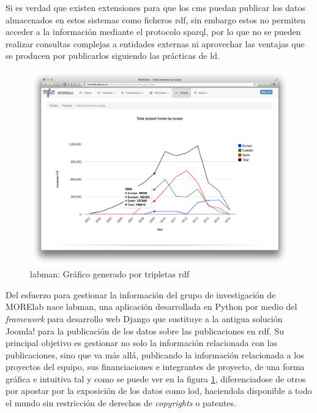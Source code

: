 Si es verdad que existen extensiones para que los \acrshort{cms} puedan publicar los datos almacenados en estos sistemas como ficheros \acrfull{rdf}, sin embargo estos no permiten acceder a la información mediante el protocolo \acrshort{sparql}, por lo que no se pueden realizar consultas complejas a entidades externas ni aprovechar las ventajas que se producen por publicarlos siguiendo las prácticas de \acrfull{ld}\cite{ld_benefits}.

\begin{figure}[!htp]
	\centering
	\includegraphics[scale=0.21]{fig/labman-chart}
	\caption{\acrshort{labman}: Gráfico generado por tripletas \acrshort{rdf}}\label{fig:labmanchart}
\end{figure}

Del esfuerzo para gestionar la información del grupo de investigación de MORElab nace \acrshort{labman}, una aplicación desarrollada en Python\cite{Python} por medio del \textit{framework} para desarrollo web Django\cite{Django} que sustituye a la antigua solución Joomla! para la publicación de los datos sobre las publicaciones en \acrfull{rdf}\cite{RDF}. Su principal objetivo es gestionar no solo la información relacionada con las publicaciones, sino que va más allá, publicando la información relacionada a los proyectos del equipo, sus financiaciones e integrantes de proyecto, de una forma gráfica e intuitiva tal y como se puede ver en la figura \ref{fig:labmanchart}, diferenciadose de otros  por apostar por la exposición de los datos como \acrlong{lod}\cite{linkeddata}, haciendola disponible a todo el mundo sin restricción de derechos de \textit{copyrights} o patentes.\cite{pena_visual_2014}